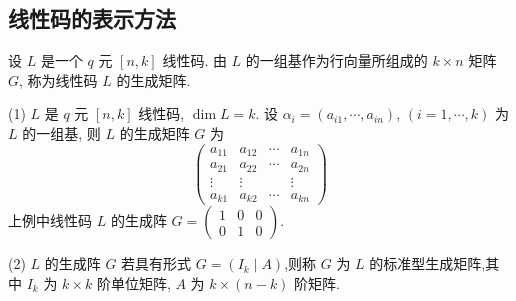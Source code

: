 \subsection{线性码的表示方法}
\begin{definition}
     设 $ L $ 是一个 $ q $ 元 $ [n, k] $ 线性码. 由 $ L $ 的一组基作为行向量所组成的 $ k \times n $ 矩阵 $ G $, 称为线性码 $ L $ 的生成矩阵.
\end{definition}
\begin{remark}
    (1) $ L $ 是 $ q $ 元 $ [n, k] $ 线性码, $ \operatorname{dim} L=k $. 设 $ \alpha_{i}=\left(a_{i 1}, \cdots, a_{i n}\right) $, $ (i=1, \cdots, k) $ 为 $ L $ 的一组基, 则 $ L $ 的生成矩阵 $ G $ 为
$$
\left(\begin{array}{cccc}
a_{11} & a_{12} & \cdots & a_{1 n} \\
a_{21} & a_{22} & \cdots & a_{2 n} \\
\vdots & \vdots & & \vdots \\
a_{k 1} & a_{k 2} & \cdots & a_{k n}
\end{array}\right)
$$
上例中线性码 $ L $ 的生成阵 $ G=\left(\begin{array}{lll}1 & 0 & 0 \\ 0 & 1 & 0\end{array}\right) $.

(2) $ L $ 的生成阵 $ G $ 若具有形式 $ G=\left(I_{k} \mid A\right) $,则称 $ G $ 为 $ L $ 的标准型生成矩阵,其中 $ I_{k} $ 为 $ k \times k $ 阶单位矩阵, $ A $ 为 $ k \times(n-k) $ 阶矩阵.


\end{remark}
